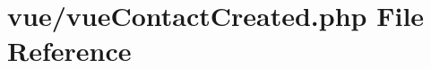 \hypertarget{vue_contact_created_8php}{}\section{vue/vue\+Contact\+Created.php File Reference}
\label{vue_contact_created_8php}
